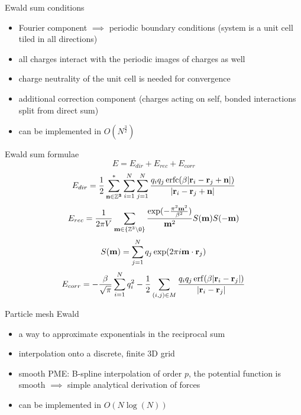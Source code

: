 \documentclass[11pt]{beamer}
\DeclareMathOperator\erf{erf}
\DeclareMathOperator\erfc{erfc}
\begin{document}
\begin{frame}{Ewald sum conditions}
\begin{itemize}
\item Fourier component $\implies$ periodic boundary conditions (system is a unit cell tiled in all directions)
\item all charges interact with the periodic images of charges as well
\item charge neutrality of the unit cell is needed for convergence
\item additional correction component (charges acting on self, bonded interactions split from direct sum)
\item can be implemented in $O(N^\frac{3}{2})$


\end{itemize}
\end{frame}

\begin{frame}{Ewald sum formulae}
\[E = E_{dir} + E_{rec} + E_{corr}\]
\[
E_{dir} = \frac{1}{2}\sum\limits_{\bold{n\in \mathbb{Z}^3}}^*\sum\limits_{i=1}^N\sum\limits_{j=1}^N\frac{q_i q_j \erfc(\beta\lvert\bold{r}_i - \bold{r}_j + \bold{n} \rvert)}{\lvert\bold{r}_i - \bold{r}_j + \bold{n} \rvert}
\]
\[
E_{rec}=\frac{1}{2\pi V}\sum\limits_{\bold{m} \in \{\mathbb{Z}^3 \setminus {0}\}}\frac{\exp(-\frac{\pi^2\bold{m}^2}{\beta^2})}{\bold{m}^2}S(\bold{m})S(\bold{-m})
\]
\[
 S(\bold{m}) = 
\sum\limits_{j=1}^Nq_j \exp(2\pi i\bold{m}\cdot\bold{r}_j)
\]
\[E_{corr} =  - \frac{\beta}{\sqrt{\pi}}\sum\limits_{i=1}^N q_i^2-\frac{1}{2}\sum\limits_{(i,j)\in M}\frac{q_i q_j \erf(\beta\lvert\bold{r}_i - \bold{r}_j\rvert)}{\lvert\bold{r}_i - \bold{r}_j\rvert}\]
\end{frame}

\begin{frame}{Particle mesh Ewald}
\begin{itemize}
\item a way to approximate exponentials in the reciprocal sum 
\item interpolation onto a discrete, finite 3D grid
\item smooth PME: B-spline interpolation of order $p$, the potential function is smooth $\implies$ simple analytical derivation of forces
\item can be implemented in $O(N \log(N))$
\end{itemize}
\end{frame}
\end{document}
